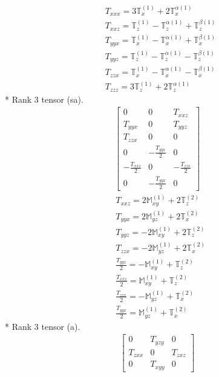 \documentclass[fleqn,8pt,landscape]{jsarticle}
\begin{document}
\begin{align*}
& T_{xxx} = 3 \mathbb{T}_{x}^{(1)} + 2 \mathbb{T}_{x}^{\alpha(1)} \\
& T_{xxz} = \mathbb{T}_{z}^{(1)} - \mathbb{T}_{z}^{\alpha(1)} + \mathbb{T}_{z}^{\beta(1)} \\
& T_{yyx} = \mathbb{T}_{x}^{(1)} - \mathbb{T}_{x}^{\alpha(1)} + \mathbb{T}_{x}^{\beta(1)} \\
& T_{yyz} = \mathbb{T}_{z}^{(1)} - \mathbb{T}_{z}^{\alpha(1)} - \mathbb{T}_{z}^{\beta(1)} \\
& T_{zzx} = \mathbb{T}_{x}^{(1)} - \mathbb{T}_{x}^{\alpha(1)} - \mathbb{T}_{x}^{\beta(1)} \\
& T_{zzz} = 3 \mathbb{T}_{z}^{(1)} + 2 \mathbb{T}_{z}^{\alpha(1)}
\end{align*}
* Rank 3 tensor (sa).
\begin{align*}
\begin{bmatrix} 0 & 0 & T_{xxz} \\ T_{yyx} & 0 & T_{yyz} \\ T_{zzx} & 0 & 0 \\ 0 & - \frac{T_{yyz}}{2} & 0 \\ - \frac{T_{xxz}}{2} & 0 & - \frac{T_{zzx}}{2} \\ 0 & - \frac{T_{yyx}}{2} & 0 \end{bmatrix}
\end{align*}
\begin{align*}
& T_{xxz} = 2 \mathbb{M}_{xy}^{(1)} + 2 \mathbb{T}_{z}^{(2)} \\
& T_{yyx} = 2 \mathbb{M}_{yz}^{(1)} + 2 \mathbb{T}_{x}^{(2)} \\
& T_{yyz} = - 2 \mathbb{M}_{xy}^{(1)} + 2 \mathbb{T}_{z}^{(2)} \\
& T_{zzx} = - 2 \mathbb{M}_{yz}^{(1)} + 2 \mathbb{T}_{x}^{(2)} \\
& \frac{T_{yyz}}{2} = - \mathbb{M}_{xy}^{(1)} + \mathbb{T}_{z}^{(2)} \\
& \frac{T_{xxz}}{2} = \mathbb{M}_{xy}^{(1)} + \mathbb{T}_{z}^{(2)} \\
& \frac{T_{zzx}}{2} = - \mathbb{M}_{yz}^{(1)} + \mathbb{T}_{x}^{(2)} \\
& \frac{T_{yyx}}{2} = \mathbb{M}_{yz}^{(1)} + \mathbb{T}_{x}^{(2)}
\end{align*}
* Rank 3 tensor (a).
\begin{align*}
\begin{bmatrix} 0 & T_{yzy} & 0 \\ T_{zxx} & 0 & T_{zxz} \\ 0 & T_{xyy} & 0 \end{bmatrix}
\end{align*}
\end{document}
